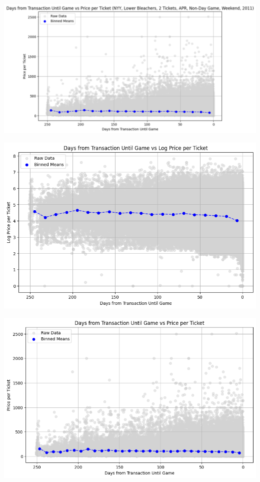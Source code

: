 \documentclass[
  12pt]{article}
\begin{document}
\includegraphics{images/10.png}

\includegraphics{images/8-01.png}

\includegraphics{images/7.png}
\end{document}
